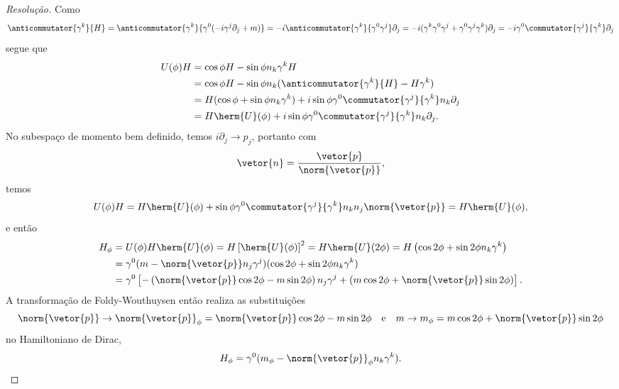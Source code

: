 \begin{proof}[Resolução]
    Como
    \begin{equation*}
        \anticommutator{\gamma^k}{H} = \anticommutator{\gamma^k}{\gamma^0(-i \gamma^j\partial_j + m)} = -i\anticommutator{\gamma^k}{\gamma^0\gamma^j}\partial_j = -i (\gamma^k \gamma^0 \gamma^j + \gamma^0 \gamma^j \gamma^k) \partial_j = -i \gamma^0\commutator{\gamma^j}{\gamma^k} \partial_j
    \end{equation*}
    segue que
    \begin{align*}
        U(\phi)H &= \cos\phi H - \sin\phi n_k \gamma^k H\\
                   &= \cos\phi H - \sin\phi n_k (\anticommutator{\gamma^k}{H}-H \gamma^k)\\
                   &= H(\cos\phi + \sin\phi n_k \gamma^k) + i \sin\phi \gamma^0 \commutator{\gamma^j}{\gamma^k}n_k\partial_j\\
                   &= H \herm{U}(\phi) + i\sin\phi \gamma^0 \commutator{\gamma^j}{\gamma^k} n_k \partial_j.
    \end{align*}
    No subespaço de momento bem definido, temos \(i \partial_j \to p_j\), portanto com 
    \begin{equation*}
        \vetor{n} = \frac{\vetor{p}}{\norm{\vetor{p}}},
    \end{equation*}
    temos
    \begin{equation*}
        U(\phi)H = H \herm{U}(\phi) + \sin\phi \gamma^0 \commutator{\gamma^j}{\gamma^k} n_k n_j \norm{\vetor{p}} = H \herm{U}(\phi),
    \end{equation*}
    e então
    \begin{align*}
        H_\phi &= U(\phi)H \herm{U}(\phi) = H \left[\herm{U}(\phi)\right]^2 = H  \herm{U}(2\phi) = H\left(\cos{2\phi} + \sin{2\phi} n_k \gamma^k\right)\\
               &= \gamma^0 (m - \norm{\vetor{p}}n_j \gamma^j) (\cos{2\phi} + \sin{2\phi} n_k \gamma^k)\\
               &= \gamma^0 \left[-\left(\norm{\vetor{p}} \cos{2\phi}-m \sin{2\phi}\right)n_j \gamma^j + \left(m \cos{2\phi} + \norm{\vetor{p}}\sin{2\phi}\right)\right].
    \end{align*}
    A transformação de Foldy-Wouthuysen então realiza as substituições
    \begin{equation*}
        \norm{\vetor{p}} \to \norm{\vetor{p}}_\phi = \norm{\vetor{p}} \cos{2\phi} - m \sin{2\phi}
        \quad\text{e}\quad
        m \to m_\phi = m\cos{2\phi} + \norm{\vetor{p}} \sin{2\phi}
    \end{equation*}
    no Hamiltoniano de Dirac,
    \begin{equation*}
        H_\phi = \gamma^0(m_\phi - \norm{\vetor{p}}_\phi n_k \gamma^k).
    \end{equation*}


\end{proof}
